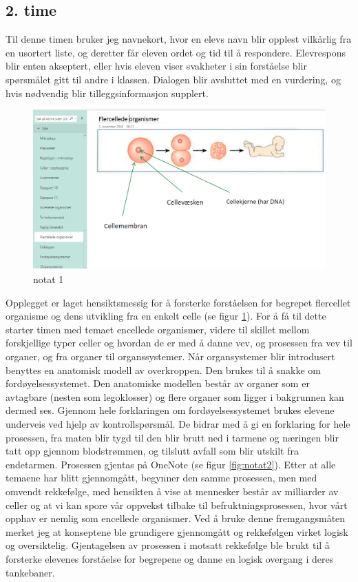 \documentclass[main.tex]{subfiles}
\begin{document}
\subsection*{2. time}

Til denne timen bruker jeg navnekort, hvor en elevs navn blir opplest vilkårlig fra en usortert liste, 
og deretter får eleven 
ordet og tid til å respondere. Elevrespons blir enten akseptert, eller hvis eleven viser svakheter
i sin forståelse blir spørsmålet gitt til andre i klassen. Dialogen blir avsluttet med en vurdering,
og hvis nødvendig blir tilleggsinformasjon supplert. 

\begin{figure}[h!]
\includegraphics[scale = 0.6]{../figures/onenote_flercellet.png}
\caption{notat 1}
\label{fig:notat1}
\end{figure}

Opplegget er laget hensiktsmessig for å forsterke forståelsen for begrepet flercellet organisme og dens utvikling fra 
en enkelt celle (se figur \ref{fig:notat1}). For å få til dette starter timen med temaet encellede organismer, 
videre til skillet mellom forskjellige typer celler og hvordan de er med å danne vev, og prosessen fra vev til
organer, og fra organer til organssystemer. Når organsystemer blir introdusert benyttes 
en anatomisk modell av overkroppen. Den brukes til å snakke om fordøyelsessystemet.
Den anatomiske modellen består av organer som er avtagbare (nesten som legoklosser) og flere organer 
som ligger i bakgrunnen kan dermed ses. Gjennom hele forklaringen om fordøyelsessystemet brukes
elevene underveis ved hjelp av kontrollspørsmål. De bidrar med å gi en forklaring for hele prosessen, 
fra maten blir tygd til den blir brutt ned i tarmene og næringen blir tatt opp gjennom blodstrømmen, 
og tilslutt avfall som blir utskilt fra endetarmen. Prosessen gjentas på OneNote (se figur \ref{fig:notat2}). 
Etter at alle temaene har blitt gjennomgått, begynner den samme prosessen, 
men med omvendt rekkefølge, med hensikten å vise at mennesker består av milliarder av celler og 
at vi kan spore vår oppvekst tilbake til befruktningsprosessen, hvor vårt opphav er nemlig som
encellede organismer. Ved å bruke denne fremgangsmåten merket jeg at konseptene ble grundigere
gjennomgått og rekkefølgen virket logisk og oversiktelig. Gjentagelsen av prosessen i motsatt
rekkefølge ble brukt til å forsterke elevenes forståelse for begrepene og danne en logisk 
overgang i deres tankebaner. 
\end{document}
